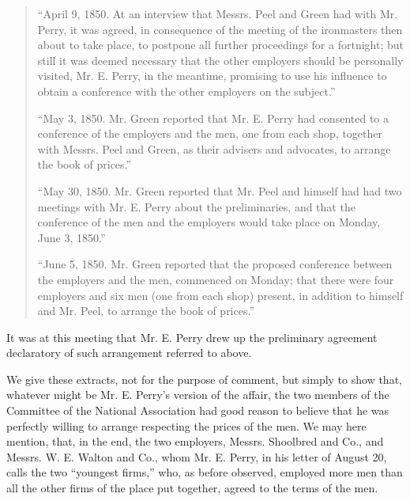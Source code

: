 \begin{quote}
    \hspace{2em} ``April 9, 1850. At an interview that Messrs. Peel and
    Green had with Mr. Perry, it was agreed, in consequence of the
    meeting of the ironmasters then about to take place, to postpone all
    further proceedings for a fortnight; but still it was deemed
    necessary that the other employers should be personally visited, 
    Mr. E. Perry, in the meantime, promising to use his influence to obtain
    a conference with the other employers on the subject.''

    \hspace{2em} ``May 3, 1850. Mr. Green reported that Mr. E. Perry had
    consented to a conference of the employers and the men, one from
    each shop, together with Messrs. Peel and Green, as their advisers
    and advocates, to arrange the book of prices.''

    \hspace{2em} ``May 30, 1850. Mr. Green reported that Mr. Peel and
    himself had had two meetings with Mr. E. Perry about the
    preliminaries, and that the conference of the men and the employers
    would take place on Monday, June 3, 1850.''

    \hspace{2em} ``June 5, 1850. Mr. Green reported that the proposed
    conference between the employers and the men, commenced on Monday;
    that there were four employers and six men (one from each shop)
    present, in addition to himself and Mr. Peel, to arrange the book of
    prices.''
\end{quote}


It was at this meeting that Mr. E. Perry drew up the preliminary
agreement declaratory of such arrangement referred to above.

We give these extracts, not for the purpose of comment, but simply to
show that, whatever might be Mr. E. Perry's version of the affair, the
two members of the Committee of the National Association had good reason
to believe that he was perfectly willing to arrange respecting the
prices of the men. We may here mention, that, in the end, the two
employers, Messrs. Shoolbred and Co., and Messrs. W. E. Walton and Co.,
whom Mr. E. Perry, in his letter of August 20, calls the two ``youngest
firms,'' who, as before observed, employed more men than all the other
firms of the place put together, agreed to the terms of the men.

